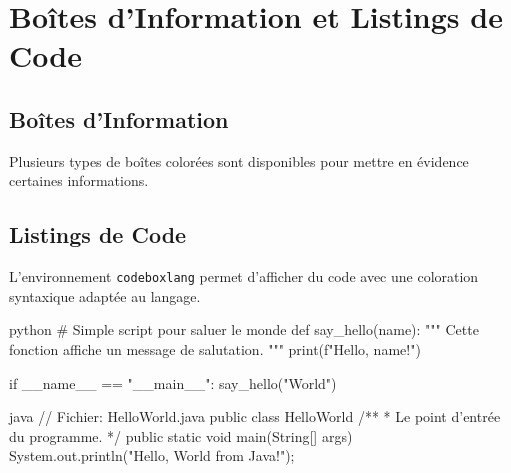 \documentclass{mytex}
\begin{document}
	
	\section{Boîtes d'Information et Listings de Code}
	
	\subsection{Boîtes d'Information}
	Plusieurs types de boîtes colorées sont disponibles pour mettre en évidence certaines informations.
	
	
	
	
	
	\subsection{Listings de Code}
	L'environnement \texttt{codeboxlang} permet d'afficher du code avec une coloration syntaxique adaptée au langage.
	
	\begin{codeboxlang}{python}
		# Simple script pour saluer le monde
		def say_hello(name):
		"""
		Cette fonction affiche un message de salutation.
		"""
		print(f"Hello, {name}!")
		
		if __name__ == "__main__":
		say_hello("World")
	\end{codeboxlang}
	
	\begin{codeboxlang}{java}
		// Fichier: HelloWorld.java
		public class HelloWorld {
			/**
			* Le point d'entrée du programme.
			*/
			public static void main(String[] args) {
				System.out.println("Hello, World from Java!"); 
			}
		}
	\end{codeboxlang}
	
\end{document}
